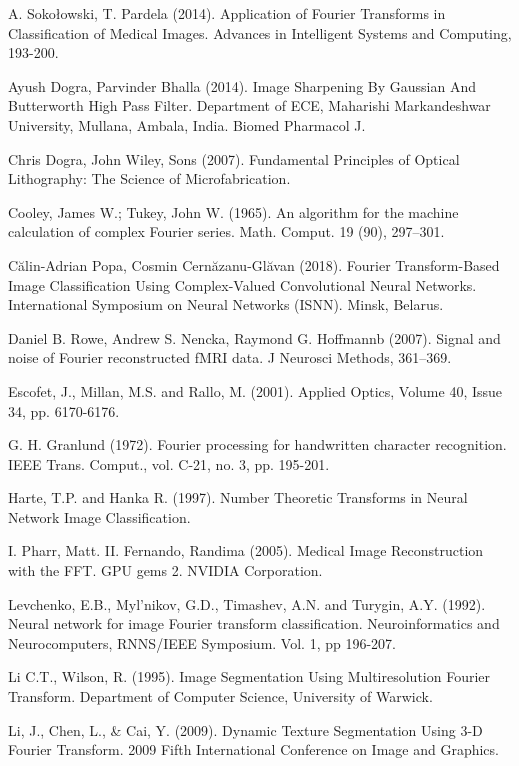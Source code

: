 \begin{thebibliography}{1}
 A. Sokołowski, T. Pardela (2014). Application of Fourier Transforms in Classification of Medical Images. Advances in Intelligent Systems and Computing, 193-200.

 Ayush Dogra, Parvinder Bhalla (2014). Image Sharpening By Gaussian And Butterworth High Pass Filter. Department of ECE, Maharishi Markandeshwar University, Mullana, Ambala, India. Biomed Pharmacol J. 

 Chris Dogra, John Wiley, Sons (2007). Fundamental Principles of Optical Lithography: The Science of Microfabrication. 

 Cooley, James W.; Tukey, John W. (1965). An algorithm for the machine calculation of complex Fourier series. Math. Comput. 19 (90), 297–301.

 Călin-Adrian Popa, Cosmin Cernăzanu-Glăvan (2018). Fourier Transform-Based Image Classification Using Complex-Valued Convolutional Neural Networks. International Symposium on Neural Networks (ISNN). Minsk, Belarus.

 Daniel B. Rowe, Andrew S. Nencka, Raymond G. Hoffmannb (2007). Signal and noise of Fourier reconstructed fMRI data. J Neurosci Methods, 361–369.

 Escofet, J., Millan, M.S. and Rallo, M. (2001). Applied Optics, Volume 40, Issue 34, pp. 6170-6176.

 G. H. Granlund (1972). Fourier processing for handwritten character recognition. IEEE Trans. Comput., vol. C-21, no. 3, pp. 195-201.

 Harte, T.P. and Hanka R. (1997). Number Theoretic Transforms in Neural Network Image Classification.

 I. Pharr, Matt. II. Fernando, Randima (2005). Medical Image Reconstruction with the FFT. GPU gems 2. NVIDIA Corporation.

 Levchenko, E.B., Myl’nikov, G.D., Timashev, A.N. and Turygin, A.Y. (1992). Neural network for image Fourier transform classification. Neuroinformatics and Neurocomputers, RNNS/IEEE Symposium. Vol. 1, pp 196-207.

 Li C.T., Wilson, R. (1995). Image Segmentation Using Multiresolution Fourier Transform. Department of Computer Science, University of Warwick.

 Li, J., Chen, L., \& Cai, Y. (2009). Dynamic Texture Segmentation Using 3-D Fourier Transform. 2009 Fifth International Conference on Image and Graphics. 


\end{thebibliography}
